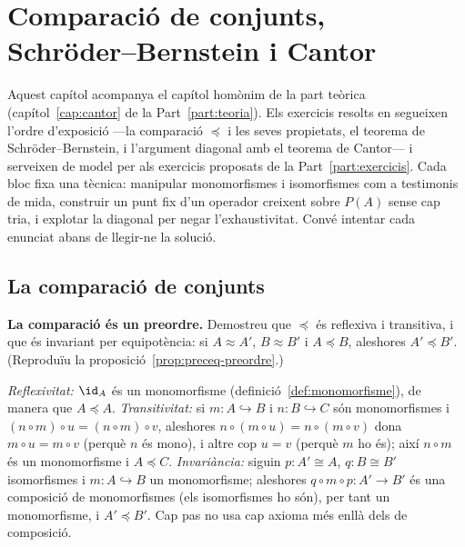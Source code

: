 \chapter[Schröder--Bernstein i Cantor]{Comparació de conjunts,\texorpdfstring{\\}{ }Schröder--Bernstein i Cantor}\label{cap:practica-cantor}

Aquest capítol acompanya el capítol homònim de la part teòrica (capítol~\ref{cap:cantor} de la Part~\ref{part:teoria}). Els exercicis resolts en segueixen l'ordre d'exposició ---la comparació \(\preceq\) i les seves propietats, el teorema de Schröder--Bernstein, i l'argument diagonal amb el teorema de Cantor--- i serveixen de model per als exercicis proposats de la Part~\ref{part:exercicis}. Cada bloc fixa una tècnica: manipular monomorfismes i isomorfismes com a testimonis de mida, construir un punt fix d'un operador creixent sobre \(P(A)\) sense cap tria, i explotar la diagonal per negar l'exhaustivitat. Convé intentar cada enunciat abans de llegir-ne la solució.

\section{La comparació de conjunts}\label{prac:comparacio-conjunts}

\begin{exercici}
\textbf{La comparació és un preordre.} Demostreu que \(\preceq\) és reflexiva i transitiva, i que és invariant per equipotència: si \(A\approx A'\), \(B\approx B'\) i \(A\preceq B\), aleshores \(A'\preceq B'\). (Reproduïu la proposició~\ref{prop:preceq-preordre}.)
\end{exercici}
\begin{solucio}
\emph{Reflexivitat:} \(\id_A\) és un monomorfisme (definició~\ref{def:monomorfisme}), de manera que \(A\preceq A\). \emph{Transitivitat:} si \(m\colon A\hookrightarrow B\) i \(n\colon B\hookrightarrow C\) són monomorfismes i \((n\circ m)\circ u=(n\circ m)\circ v\), aleshores \(n\circ(m\circ u)=n\circ(m\circ v)\) dona \(m\circ u=m\circ v\) (perquè \(n\) és mono), i altre cop \(u=v\) (perquè \(m\) ho és); així \(n\circ m\) és un monomorfisme i \(A\preceq C\). \emph{Invariància:} siguin \(p\colon A'\cong A\), \(q\colon B\cong B'\) isomorfismes i \(m\colon A\hookrightarrow B\) un monomorfisme; aleshores \(q\circ m\circ p\colon A'\to B'\) és una composició de monomorfismes (els isomorfismes ho són), per tant un monomorfisme, i \(A'\preceq B'\). Cap pas no usa cap axioma més enllà dels de composició.
\end{solucio}

